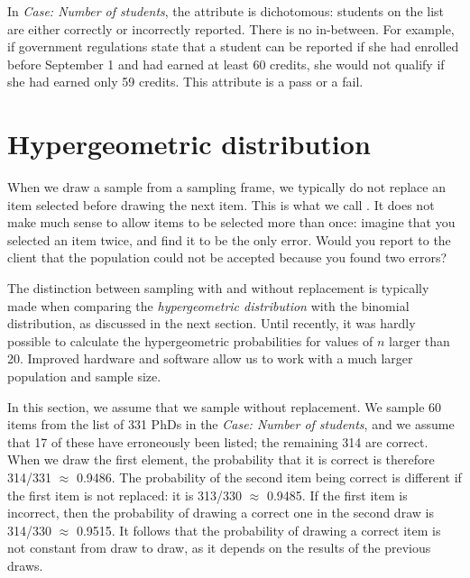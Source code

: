 In \emph{Case: Number of students}, the attribute is dichotomous: students on the list are either correctly or incorrectly reported. There is no in-between. For example, if government regulations state that a student can be reported if she had enrolled before September 1 and had earned at least 60 credits, she would not qualify if she had earned only 59 credits. This attribute is a pass or a fail.

\section{Hypergeometric distribution} %
\label{sec:hypergeometric_distribution}

When we draw a sample from a sampling frame, we typically do not replace an item selected before drawing the next item. This is what we call . It does not make much sense to allow items to be selected more than once: imagine that you selected an item twice, and find it to be the only error. Would you report to the client that the population could not be accepted because you found two errors?

The distinction between sampling with and without replacement is typically made when comparing the \emph{hypergeometric distribution} with the binomial distribution, as discussed in the next section. Until recently, it was hardly possible to calculate the hypergeometric probabilities for values of $n$ larger than 20. Improved hardware and software allow us to work with a much larger population and sample size.

In this section, we assume that we sample without replacement. We sample 60 items from the list of 331 PhDs in the \emph{Case: Number of students}, and we assume that 17 of these have erroneously been listed; the remaining 314 are correct. When we draw the first element, the probability that it is correct is therefore 314/331 $\approx$ 0.9486. The probability of the second item being correct is different if the first item is not replaced: it is 313/330 $\approx$ 0.9485. If the first item is incorrect, then the probability of drawing a correct one in the second draw is 314/330 $\approx$ 0.9515. It follows that the probability of drawing a correct item is not constant from draw to draw, as it depends on the results of the previous draws.

